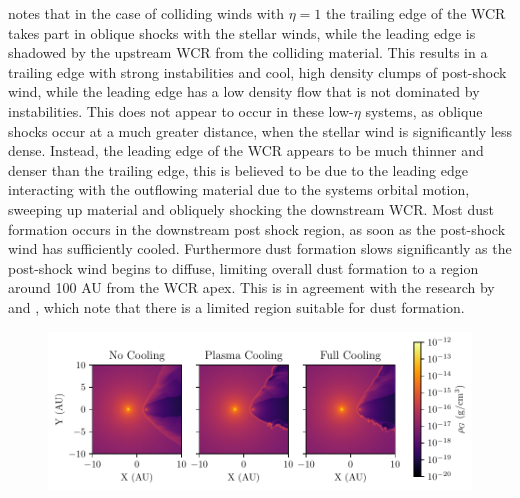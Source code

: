 \textcite{pittard_3d_2009} notes that in the case of colliding winds with $\eta = 1$ the trailing edge of the WCR takes part in oblique shocks with the stellar winds, while the leading edge is shadowed by the upstream WCR from the colliding material.
This results in a trailing edge with strong instabilities and cool, high density clumps of post-shock wind, while the leading edge has a low density flow that is not dominated by instabilities.
This does not appear to occur in these low-$\eta$ systems, as oblique shocks occur at a much greater distance, when the stellar wind is significantly less dense.
Instead, the leading edge of the WCR appears to be much thinner and denser than the trailing edge, this is believed to be due to the leading edge interacting with the outflowing material due to the systems orbital motion, sweeping up material and obliquely shocking the downstream WCR. %
Most dust formation occurs in the downstream post shock region, as soon as the post-shock wind has sufficiently cooled.
Furthermore dust formation slows significantly as the post-shock wind begins to diffuse, limiting overall dust formation to a region around 100 AU from the WCR apex. %
This is in agreement with the research by \textcite{williams_dust_1990} and \textcite{hendrix_pinwheels_2016}, which note that there is a limited region suitable for dust formation.

\begin{figure}
  \centering
  \includegraphics{assets/results/radiative/radiative-crop-2-rho.pdf}
  \caption[]{}
  \label{fig:postshockcompression}
\end{figure}

